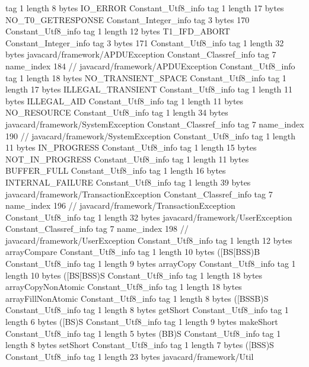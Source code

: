 {{{			tag	1
			length	8
			bytes	IO_ERROR
		}
		Constant_Utf8_info {
			tag	1
			length	17
			bytes	NO_T0_GETRESPONSE
		}
		Constant_Integer_info {
			tag	3
			bytes	170
		}
		Constant_Utf8_info {
			tag	1
			length	12
			bytes	T1_IFD_ABORT
		}
		Constant_Integer_info {
			tag	3
			bytes	171
		}
		Constant_Utf8_info {
			tag	1
			length	32
			bytes	javacard/framework/APDUException
		}
		Constant_Classref_info {
			tag	7
			name_index	184		// javacard/framework/APDUException
		}
		Constant_Utf8_info {
			tag	1
			length	18
			bytes	NO_TRANSIENT_SPACE
		}
		Constant_Utf8_info {
			tag	1
			length	17
			bytes	ILLEGAL_TRANSIENT
		}
		Constant_Utf8_info {
			tag	1
			length	11
			bytes	ILLEGAL_AID
		}
		Constant_Utf8_info {
			tag	1
			length	11
			bytes	NO_RESOURCE
		}
		Constant_Utf8_info {
			tag	1
			length	34
			bytes	javacard/framework/SystemException
		}
		Constant_Classref_info {
			tag	7
			name_index	190		// javacard/framework/SystemException
		}
		Constant_Utf8_info {
			tag	1
			length	11
			bytes	IN_PROGRESS
		}
		Constant_Utf8_info {
			tag	1
			length	15
			bytes	NOT_IN_PROGRESS
		}
		Constant_Utf8_info {
			tag	1
			length	11
			bytes	BUFFER_FULL
		}
		Constant_Utf8_info {
			tag	1
			length	16
			bytes	INTERNAL_FAILURE
		}
		Constant_Utf8_info {
			tag	1
			length	39
			bytes	javacard/framework/TransactionException
		}
		Constant_Classref_info {
			tag	7
			name_index	196		// javacard/framework/TransactionException
		}
		Constant_Utf8_info {
			tag	1
			length	32
			bytes	javacard/framework/UserException
		}
		Constant_Classref_info {
			tag	7
			name_index	198		// javacard/framework/UserException
		}
		Constant_Utf8_info {
			tag	1
			length	12
			bytes	arrayCompare
		}
		Constant_Utf8_info {
			tag	1
			length	10
			bytes	([BS[BSS)B
		}
		Constant_Utf8_info {
			tag	1
			length	9
			bytes	arrayCopy
		}
		Constant_Utf8_info {
			tag	1
			length	10
			bytes	([BS[BSS)S
		}
		Constant_Utf8_info {
			tag	1
			length	18
			bytes	arrayCopyNonAtomic
		}
		Constant_Utf8_info {
			tag	1
			length	18
			bytes	arrayFillNonAtomic
		}
		Constant_Utf8_info {
			tag	1
			length	8
			bytes	([BSSB)S
		}
		Constant_Utf8_info {
			tag	1
			length	8
			bytes	getShort
		}
		Constant_Utf8_info {
			tag	1
			length	6
			bytes	([BS)S
		}
		Constant_Utf8_info {
			tag	1
			length	9
			bytes	makeShort
		}
		Constant_Utf8_info {
			tag	1
			length	5
			bytes	(BB)S
		}
		Constant_Utf8_info {
			tag	1
			length	8
			bytes	setShort
		}
		Constant_Utf8_info {
			tag	1
			length	7
			bytes	([BSS)S
		}
		Constant_Utf8_info {
			tag	1
			length	23
			bytes	javacard/framework/Util
}}}

